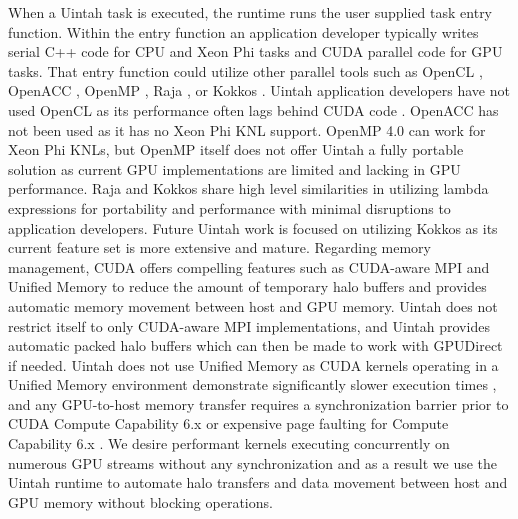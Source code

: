 \documentclass[12pt]{article}
\begin{document}
When a Uintah task is executed, the runtime runs the user supplied task entry function.  Within the entry function an application developer typically writes serial C++ code for CPU and Xeon Phi tasks and CUDA parallel code for GPU tasks.  That entry function could utilize other parallel tools such as OpenCL \cite{opencl-specification}, OpenACC \cite{openacc-25}, OpenMP \cite{openmp}, Raja \cite{raja}, or Kokkos \cite{kokkos2012}.  Uintah application developers have not used OpenCL as its performance often lags behind CUDA code \cite{Sorman2016}.  OpenACC has not been used as it has no Xeon Phi KNL support.  OpenMP 4.0 can work for Xeon Phi KNLs, but OpenMP itself does not offer Uintah a fully portable solution as current GPU implementations are limited and lacking in GPU performance\cite{Martineau2016}.  Raja and Kokkos share high level similarities in utilizing lambda expressions for portability and performance with minimal disruptions to application developers.  Future Uintah work is focused on utilizing Kokkos as its current feature set is more extensive and mature.  Regarding memory management, CUDA offers compelling features such as CUDA-aware MPI and Unified Memory to reduce the amount of temporary halo buffers and provides automatic memory movement between host and GPU memory.  Uintah does not restrict itself to only CUDA-aware MPI implementations, and Uintah provides automatic packed halo buffers which can then be made to work with GPUDirect if needed.  Uintah does not use Unified Memory as CUDA kernels operating in a Unified Memory environment demonstrate significantly slower execution times \cite{Landaverde2014AnIO}, and any GPU-to-host memory transfer requires a synchronization barrier prior to CUDA Compute Capability 6.x or expensive page faulting for Compute Capability 6.x \cite{nvidia-programming-guide-80}.  We desire performant kernels executing concurrently on numerous GPU streams without any synchronization and as a result we use the Uintah runtime to automate halo transfers and data movement between host and GPU memory without blocking operations.
\end{document}
